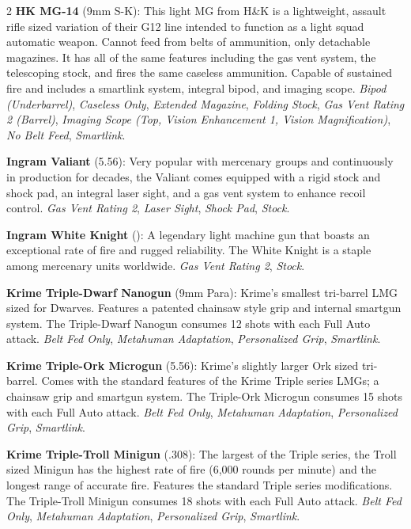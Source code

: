 \documentclass[
  oneside]{article}
\begin{document}
\begin{multicols}{2}
\textbf{HK MG-14} (9mm S-K): This light MG from
H\&K is a lightweight, assault rifle sized
variation of their G12 line intended to function
as a light squad automatic weapon. Cannot feed
from belts of ammunition, only detachable
magazines. It has all of the same features
including the gas vent system, the telescoping
stock, and fires the same caseless ammunition.
Capable of sustained fire and includes a smartlink
system, integral bipod, and imaging scope.
\emph{Bipod (Underbarrel)}, \emph{Caseless Only},
\emph{Extended Magazine}, \emph{Folding Stock},
\emph{Gas Vent Rating 2 (Barrel)}, \emph{Imaging
Scope (Top, Vision Enhancement 1, Vision
Magnification)}, \emph{No Belt Feed},
\emph{Smartlink}.

\textbf{Ingram Valiant} (5.56): Very popular with
mercenary groups and continuously in production
for decades, the Valiant comes equipped with a
rigid stock and shock pad, an integral laser
sight, and a gas vent system to enhance recoil
control. \emph{Gas Vent Rating 2}, \emph{Laser
Sight}, \emph{Shock Pad}, \emph{Stock}.

\textbf{Ingram White Knight} (): A legendary light
machine gun that boasts an exceptional rate of
fire and rugged reliability. The White Knight is a
staple among mercenary units worldwide. \emph{Gas
Vent Rating 2}, \emph{Stock}.

\textbf{Krime Triple-Dwarf Nanogun} (9mm Para):
Krime's smallest tri-barrel LMG sized for Dwarves.
Features a patented chainsaw style grip and
internal smartgun system. The Triple-Dwarf Nanogun
consumes 12 shots with each Full Auto attack.
\emph{Belt Fed Only}, \emph{Metahuman Adaptation},
\emph{Personalized Grip}, \emph{Smartlink}.

\textbf{Krime Triple-Ork Microgun} (5.56): Krime's
slightly larger Ork sized tri-barrel. Comes with
the standard features of the Krime Triple series
LMGs; a chainsaw grip and smartgun system. The
Triple-Ork Microgun consumes 15 shots with each
Full Auto attack. \emph{Belt Fed Only},
\emph{Metahuman Adaptation}, \emph{Personalized
Grip}, \emph{Smartlink}.

\textbf{Krime Triple-Troll Minigun} (.308): The
largest of the Triple series, the Troll sized
Minigun has the highest rate of fire (6,000 rounds
per minute) and the longest range of accurate
fire. Features the standard Triple series
modifications. The Triple-Troll Minigun consumes
18 shots with each Full Auto attack. \emph{Belt
Fed Only}, \emph{Metahuman Adaptation},
\emph{Personalized Grip}, \emph{Smartlink}.


\end{multicols}
\end{document}
